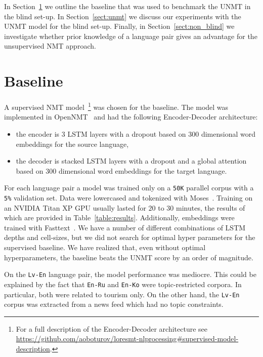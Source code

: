 \documentclass[]{article}
\begin{document}
In Section~\ref{sect:baseline} we outline the baseline that was used to benchmark the \ac{UNMT} in the blind set-up.
In Section~\ref{sect:unmt} we discuss our experiments with the \ac{UNMT} model for the blind set-up.
Finally, in Section~\ref{sect:non_blind} we investigate whether prior knowledge of a language pair gives an advantage for the unsupervised \ac{NMT} approach.

\section{Baseline}
\label{sect:baseline}

A supervised \ac{NMT} model~\footnote{For a full description of the Encoder-Decoder architecture see \url{https://github.com/aoboturov/loresmt-nlprocessing\#supervised-model-description}.} was chosen for the baseline.
The model was implemented in OpenNMT~\citep{opennmt} and had the following Encoder-Decoder architecture:
\begin{itemize}
\item the encoder is $3$ \acs{LSTM} layers with a dropout based on $300$ dimensional word embeddings for the source language,
\item the decoder is stacked \acs{LSTM} layers with a dropout and a global attention \citep{luong2015effective} based on $300$ dimensional word embeddings for the target language.
\end{itemize}

For each language pair a model was trained only on a {\tt 50K} parallel corpus with a {\tt 5\%} validation set.
Data were lowercased and tokenized with Moses~\citep{koehn2007moses}.
Training on an NVIDIA Titan XP GPU usually lasted for $20$ to $30$ minutes, the results of which are provided in Table~\ref{table:results}.
Additionally, embeddings were trained with Fasttext~\citep{bojanowski2016enriching}.
We have a number of different combinations of \acs{LSTM} depths and cell-sizes, but we did not search for optimal hyper parameters for the supervised baseline.
We have realized that, even without optimal hyperparameters, the baseline beats the \ac{UNMT} score by an order of magnitude.

On the {\tt Lv-En} language pair, the model performance was mediocre.
This could be explained by the fact that {\tt En-Ru} and {\tt En-Ko} were topic-restricted corpora.
In particular, both were related to tourism only.
On the other hand, the {\tt Lv-En} corpus was extracted from a news feed which had no topic constraints.
\end{document}
